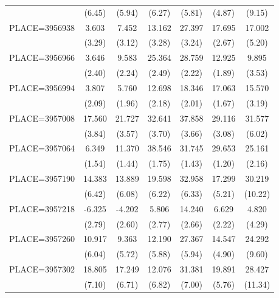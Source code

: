 {\begin{tabular}{l*{6}{c}}
                    &      (6.45)&      (5.94)&      (6.27)&      (5.81)&      (4.87)&      (9.15)\\
PLACE=3956938       &       3.603&       7.452&      13.162&      27.397&      17.695&      17.002\\
                    &      (3.29)&      (3.12)&      (3.28)&      (3.24)&      (2.67)&      (5.20)\\
PLACE=3956966       &       3.646&       9.583&      25.364&      28.759&      12.925&       9.895\\
                    &      (2.40)&      (2.24)&      (2.49)&      (2.22)&      (1.89)&      (3.53)\\
PLACE=3956994       &       3.807&       5.760&      12.698&      18.346&      17.063&      15.570\\
                    &      (2.09)&      (1.96)&      (2.18)&      (2.01)&      (1.67)&      (3.19)\\
PLACE=3957008       &      17.560&      21.727&      32.641&      37.858&      29.116&      31.577\\
                    &      (3.84)&      (3.57)&      (3.70)&      (3.66)&      (3.08)&      (6.02)\\
PLACE=3957064       &       6.349&      11.370&      38.546&      31.745&      29.653&      25.161\\
                    &      (1.54)&      (1.44)&      (1.75)&      (1.43)&      (1.20)&      (2.16)\\
PLACE=3957190       &      14.383&      13.889&      19.598&      32.958&      17.299&      30.219\\
                    &      (6.42)&      (6.08)&      (6.22)&      (6.33)&      (5.21)&     (10.22)\\
PLACE=3957218       &      -6.325&      -4.202&       5.806&      14.240&       6.629&       4.820\\
                    &      (2.79)&      (2.60)&      (2.77)&      (2.66)&      (2.22)&      (4.29)\\
PLACE=3957260       &      10.917&       9.363&      12.190&      27.367&      14.547&      24.292\\
                    &      (6.04)&      (5.72)&      (5.88)&      (5.94)&      (4.90)&      (9.60)\\
PLACE=3957302       &      18.805&      17.249&      12.076&      31.381&      19.891&      28.427\\
                    &      (7.10)&      (6.71)&      (6.82)&      (7.00)&      (5.76)&     (11.34)\\

\end{tabular}}
